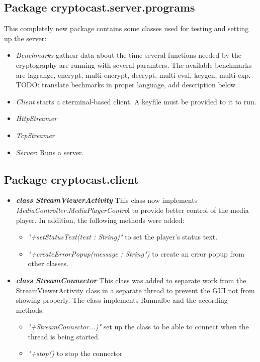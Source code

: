 \documentclass[a4paper,10pt]{scrartcl}
\begin{document}
\subsection{Package cryptocast.server.programs}
This  completely new package contains some classes used for testing and setting up the server:
\begin{itemize}
	\item \textit{Benchmarks} gathesr data about the time several functions needed by the cryptography are running
		with several paramters. The available benchmarks are  lagrange, encrypt, multi-encrypt, decrypt, multi-eval, keygen, multi-exp.
		TODO: translate bechmarks in proper language, add description below
	\item \textit{Client} starts a cterminal-based client. A keyfile must be provided to it to run.
	\item \textit{HttpStreamer} 
	\item \textit{TcpStreamer}
	\item \textit{Server}: Runs a server.
\end{itemize}


\subsection{Package cryptocast.client}

\begin{itemize}
   \item \textbf{\textit{class StreamViewerActivity}} \newline
   This class now implements  \textit{MediaController.MediaPlayerContro}l to provide better 	control of the media player. In addition, the following methods were added:
	\begin{itemize}
	 \item \textit{"+setStatusText(text : String)"} to set the player's status text.
	 \item \textit{"+createErrorPopup(message : String")} to create an error popup from other classes.
	\end{itemize}
	
    \item \textbf{\textit{class StreamConnector}} \newline
    This class was added to separate work from the StreamViewerActivity class in a separate thread to prevent the GUI not from showing properly. The class implements Runnalbe and the according methods.
	\begin{itemize}
	 \item \textit{"+StreamConnector...)"} set up the class to be able to connect when the thread is being started.
	 \item \textit{"+stop()} to stop the connector 
	\end{itemize}
	
\end{itemize}
\end{document}
